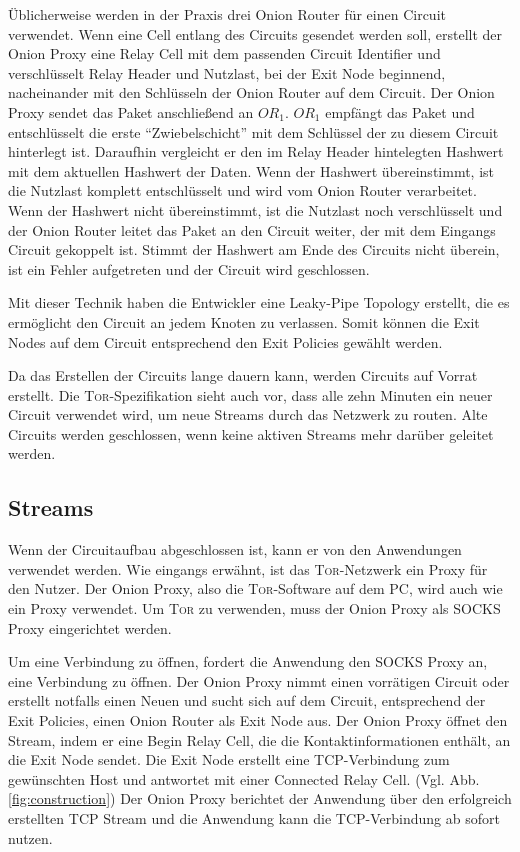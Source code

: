 \documentclass[fleqn,envcountsame,runningheads,10pt,a4paper]{llncs}
\begin{document}
Üblicherweise werden in der Praxis drei Onion Router für einen Circuit verwendet. Wenn eine Cell entlang des Circuits gesendet werden soll, erstellt der Onion Proxy eine Relay Cell mit dem passenden Circuit Identifier und verschlüsselt Relay Header und Nutzlast, bei der Exit Node beginnend, nacheinander mit den Schlüsseln der Onion Router auf dem Circuit. Der Onion Proxy sendet das Paket anschließend an $\textit{OR}_1$. $\textit{OR}_1$ empfängt das Paket und entschlüsselt die erste ``Zwiebelschicht'' mit dem Schlüssel der zu diesem Circuit hinterlegt ist. Daraufhin vergleicht er den im Relay Header hintelegten Hashwert mit dem aktuellen Hashwert der Daten. Wenn der Hashwert übereinstimmt, ist die Nutzlast komplett entschlüsselt und wird vom Onion Router verarbeitet. Wenn der Hashwert nicht übereinstimmt, ist die Nutzlast noch verschlüsselt und der Onion Router leitet das Paket an den Circuit weiter, der mit dem Eingangs Circuit gekoppelt ist. Stimmt der Hashwert am Ende des Circuits nicht überein, ist ein Fehler aufgetreten und der Circuit wird geschlossen.

Mit dieser Technik haben die Entwickler eine Leaky-Pipe Topology erstellt, die es ermöglicht den Circuit an jedem Knoten zu verlassen. Somit können die Exit Nodes auf dem Circuit entsprechend den Exit Policies gewählt werden.

Da das Erstellen der Circuits lange dauern kann, werden Circuits auf Vorrat erstellt. Die \textsc{Tor}-Spezifikation sieht auch vor, dass alle zehn Minuten ein neuer Circuit verwendet wird, um neue Streams durch das Netzwerk zu routen. Alte Circuits werden geschlossen, wenn keine aktiven Streams mehr darüber geleitet werden.

\subsection{Streams}

Wenn der Circuitaufbau abgeschlossen ist, kann er von den Anwendungen verwendet werden. Wie eingangs erwähnt, ist das \textsc{Tor}-Netzwerk ein Proxy für den Nutzer. Der Onion Proxy, also die \textsc{Tor}-Software auf dem PC, wird auch wie ein Proxy verwendet. Um \textsc{Tor} zu verwenden, muss der Onion Proxy als SOCKS Proxy \cite{rfc:socks} eingerichtet werden.

Um eine Verbindung zu öffnen, fordert die Anwendung den SOCKS Proxy an, eine Verbindung zu öffnen. Der Onion Proxy nimmt einen vorrätigen Circuit oder erstellt notfalls einen Neuen und sucht sich auf dem Circuit, entsprechend der Exit Policies, einen Onion Router als Exit Node aus. Der Onion Proxy öffnet den Stream, indem er eine Begin Relay Cell, die die Kontaktinformationen enthält, an die Exit Node sendet. Die Exit Node erstellt eine TCP-Verbindung zum gewünschten Host und antwortet mit einer Connected Relay Cell. (Vgl. Abb. \ref{fig:construction}) Der Onion Proxy berichtet der Anwendung über den erfolgreich erstellten TCP Stream und die Anwendung kann die TCP-Verbindung ab sofort nutzen.
\end{document}
